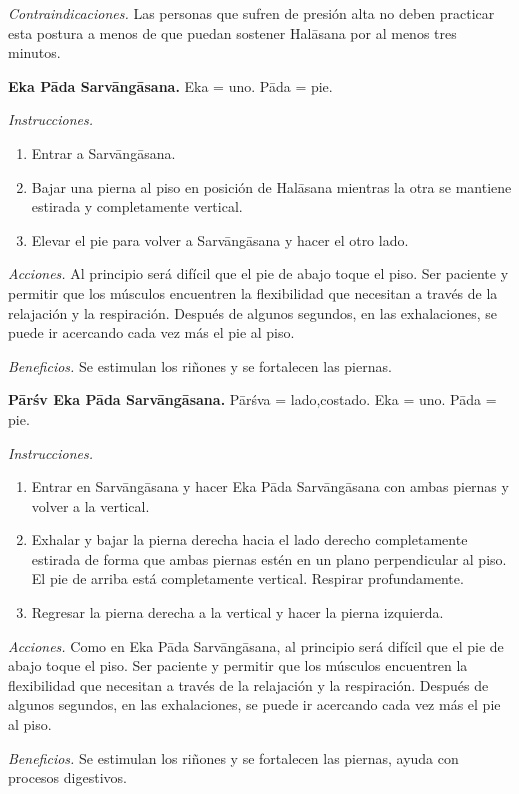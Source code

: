 \emph{Contraindicaciones.} Las personas que
sufren de presión alta no deben practicar
esta postura a menos de que puedan sostener
Halāsana por al menos tres minutos.

\medskip\noindent\textbf{Eka Pāda
Sarvāngāsana.}
Eka = uno. Pāda = pie.

\emph{Instrucciones.}
\begin{enumerate}
\item Entrar a Sarvāngāsana.
\item Bajar una pierna al piso en posición de
Halāsana mientras la otra se mantiene
estirada y completamente vertical.
\item Elevar el pie para volver a
Sarvāngāsana y hacer el otro lado.
\end{enumerate}

\emph{Acciones.} Al principio será difícil
que el pie de abajo toque el piso. Ser
paciente y permitir que los músculos
encuentren la flexibilidad que necesitan a
través de la relajación y la respiración.
Después de algunos segundos, en las
exhalaciones, se puede ir acercando cada vez
más el pie al piso.

\emph{Beneficios.} Se estimulan los riñones y
se fortalecen las piernas.

\medskip\noindent\textbf{Pārśv Eka Pāda
Sarvāngāsana.}
Pārśva = lado,costado. Eka = uno. Pāda = pie.

\emph{Instrucciones.}
\begin{enumerate}
\item Entrar en Sarvāngāsana y hacer Eka Pāda
Sarvāngāsana con ambas piernas y volver a la
vertical.
\item Exhalar y bajar la pierna derecha hacia
el lado derecho completamente estirada de
forma que ambas piernas estén en un plano
perpendicular al piso. El pie de arriba está
completamente vertical. Respirar
profundamente.
\item Regresar la pierna derecha a la
vertical y hacer la pierna izquierda.
\end{enumerate}

\emph{Acciones.} Como en Eka Pāda
Sarvāngāsana, al principio será difícil que
el pie de abajo toque el piso. Ser paciente y
permitir que los músculos encuentren la
flexibilidad que necesitan a través de la
relajación y la respiración. Después de
algunos segundos, en las exhalaciones, se
puede ir acercando cada vez más el pie al
piso.

\emph{Beneficios.} Se estimulan los riñones y
se fortalecen las piernas, ayuda con procesos
digestivos.

